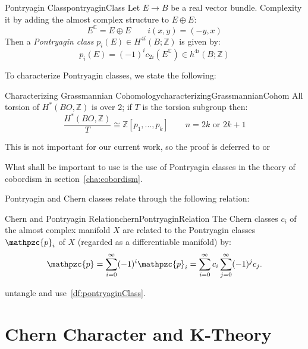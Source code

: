 \documentclass{book}
\newcommand{\C}{{\mathbb{C}}}
\newcommand{\Z}{{\mathbb{Z}}}
\newcommand{\cp}{{\mathpzc{p}}}
\begin{document}
\begin{defn}{Pontryagin Class}{pontryaginClass}
  Let $E \to B$ be a real vector bundle. Complexity it by adding the almost complex structure to $E\oplus E$:
  \[
    E^\C = E\oplus E \qquad i(x,y) = (-y,x)
  \]
  Then a \emph{Pontryagin class} $p_i(E) \in H^{4i}(B; \Z)$ is given by:
  \[
    p_i(E) = (-1)^ic_{2i}(E^\C) \in h^{4i}(B;\Z)
  \]
\end{defn}

To characterize Pontryagin classes, we state the following:

\begin{prop}{Characterizing Grassmannian Cohomology}{characterizingGrassmannianCohom}
    All torsion of $H^*(BO, \Z)$ is over $2$; if $T$ is the torsion subgroup then:
      \[
        \frac{H^*(BO, \Z)}{T} \cong \Z[p_1, ..., p_k] \qquad n = 2k\text{ or } 2k+1
      \]
\end{prop}

\begin{Proof}
  This is not important for our current work, so the proof is deferred to \cite{NateKTheory} or~\cite{hatcherVectorBundlesKTheory2017}
\end{Proof}

What shall be important to use is the use of Pontryagin classes in the theory of cobordism in
section~\ref{cha:cobordism}.

Pontryagin and Chern classes relate through the following relation:

\begin{thm}{Chern and Pontryagin Relation}{chernPontryaginRelation}
  The Chern classes $c_i$ of the almost complex manifold $X$ are related to the Pontryagin
  classes $\cp_i$ of $X$ (regarded as a differentiable manifold) by:
\[
    \cp = \sum_{i=0}^{\infty} (-1)^i \cp_i = \sum_{i=0}^{\infty} c_i \sum_{j=0}^{\infty} (-1)^j c_j.
\]
\end{thm}

\begin{Proof}
  untangle and use~\cref{df:pontryaginClass}.
\end{Proof}



\section{Chern Character and K-Theory}\label{sec:chernCharacter}
\end{document}
